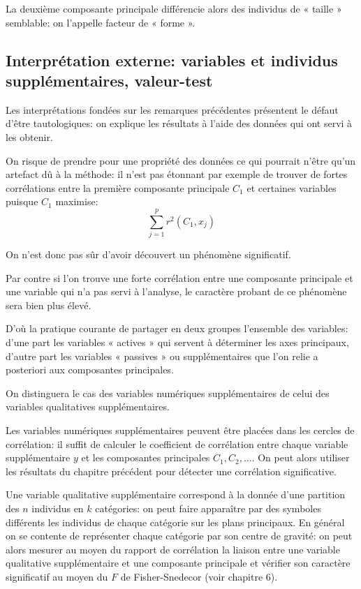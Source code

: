 \documentclass[12pt,a4paper]{article}
\begin{document}
La deuxième composante principale différencie alors des individus de « taille » semblable:
on l'appelle facteur de « forme ».

\subsection{Interprétation externe: variables et individus supplémentaires, valeur-test}

Les interprétations fondées sur les remarques précédentes présentent le défaut d'être
tautologiques: on explique les résultats à l'aide des données qui ont servi à les obtenir.

On risque de prendre pour une propriété des données ce qui pourrait n'être qu'un artefact
dû à la méthode: il n'est pas étonnant par exemple de trouver de fortes corrélations entre la
première composante principale $C_1$ et certaines variables puisque $C_1$ maximise:
\[\sum_{j=1}^p r^2(C_1, x_j)\]

On n'est donc pas sûr d'avoir découvert un phénomène significatif.

Par contre si l'on trouve une forte corrélation entre une composante principale et une variable qui n'a pas servi à l'analyse, le caractère probant de ce phénomène sera bien plus élevé.

D'où la pratique courante de partager en deux groupes l'ensemble des variables: d'une part
les variables « actives » qui servent à déterminer les axes principaux, d'autre part les variables
« passives » ou supplémentaires que l'on relie a posteriori aux composantes principales.

On distinguera le cas des variables numériques supplémentaires de celui des variables
qualitatives supplémentaires.

Les variables numériques supplémentaires peuvent être placées dans les cercles de corrélation: il suffit de calculer le coefficient de corrélation entre chaque variable supplémentaire
$y$ et les composantes principales $C_1, C_2, \dots$. On peut alors utiliser les résultats du chapitre
précédent pour détecter une corrélation significative.

Une variable qualitative supplémentaire correspond à la donnée d'une partition des $n$ individus en $k$ catégories: on peut faire apparaître par des symboles différents les individus de
chaque catégorie sur les plans principaux. En général on se contente de représenter chaque
catégorie par son centre de gravité: on peut alors mesurer au moyen du rapport de corrélation la liaison entre une variable qualitative supplémentaire et une composante principale et
vérifier son caractère significatif au moyen du $F$ de Fisher-Snedecor (voir chapitre 6).
\end{document}
